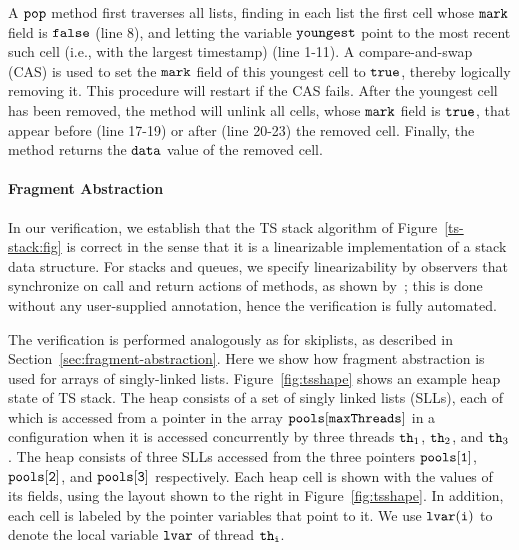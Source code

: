 A ${\tt pop}$ method first traverses all lists, finding in each list
the first cell whose ${\tt mark}$ field is ${\tt false}$ (line 8),
and letting the variable ${\tt youngest}$ point to the most recent such cell
(i.e., with the largest timestamp) (line 1-11).
A compare-and-swap (CAS) is used
to set the ${\tt mark}$ field of this youngest cell to ${\tt true}$,
thereby logically removing it.
This procedure will restart if the CAS fails. After the youngest cell has been removed, the method will unlink all cells, whose ${\tt mark}$ field is ${\tt true}$,
that appear before (line 17-19) or after (line 20-23) the removed cell.
Finally, the method returns the ${\tt data}$ value of the removed cell.

\paragraph{{\bf Fragment Abstraction}}
In our verification, we establish that the TS stack algorithm of
Figure~\ref{ts-stack:fig} is correct in the sense that it is a
linearizable implementation of a stack data structure.
For stacks and queues, we specify linearizability by 
 observers that synchronize on call and return actions of
  methods, as shown by~\cite{BEEH:icalp15}; this is done without
 any user-supplied annotation, hence the verification is fully automated.

 The verification is performed analogously as for skiplists, as described
 in Section~\ref{sec:fragment-abstraction}. Here we show how fragment
 abstraction is used for arrays of singly-linked lists.
Figure~\ref{fig:tsshape} shows an  example heap state of TS stack.
The heap consists of a set of singly linked lists (SLLs), each of which
is accessed from a pointer in the array ${\tt pools[maxThreads]}$
in a configuration when %
it is accessed concurrently by three threads ${\tt th}_1$, ${\tt th}_2$, and ${\tt th}_3$. The heap consists of three SLLs accessed from the three pointers $\tt pools[1]$, $\tt pools[2]$, and $\tt pools[3]$ respectively. Each heap cell is
shown with the values of its fields, using the layout shown to the right in
Figure~\ref{fig:tsshape}.
In addition, each cell is labeled by the pointer variables that point to it.
We use ${\tt lvar(i)}$ to denote the local
variable ${\tt lvar}$ of thread ${\tt th}_{\tt i}$.

